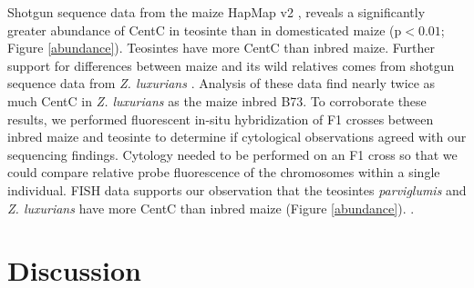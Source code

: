Shotgun sequence data from the maize HapMap v2 \citep{Chia2012}, reveals a significantly greater abundance of CentC in teosinte than in domesticated maize (p$<0.01$; Figure \ref{abundance}). Teosintes have more CentC than inbred maize.  Further support for differences between maize and its wild relatives comes from shotgun sequence data from \emph{Z. luxurians} \citep{Tenaillon2011}.  Analysis of these data find nearly twice as much CentC in \emph{Z. luxurians} as the maize inbred B73.  To corroborate these results, we performed fluorescent in-situ hybridization of F1 crosses between inbred maize and teosinte to determine if cytological observations agreed with our sequencing findings.  Cytology needed to be performed on an F1 cross so that we could compare relative probe fluorescence of the chromosomes within a single individual.  FISH data supports our observation that the teosintes \emph{parviglumis} and \emph{Z. luxurians} have more CentC than inbred maize (Figure \ref{abundance}).  .    

\section*{Discussion}
\label{discussion}




